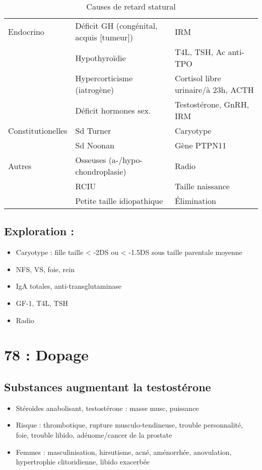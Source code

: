 \documentclass[11pt]{article}
\begin{document}
\begin{table}[htbp]
\caption{\label{tab:org2ea0a1e}
Causes de retard statural}
\centering
\begin{tabular}{lll}
\toprule
Endocrino & Déficit GH (congénital, acquis [tumeur]) & IRM\\
 & Hypothyroïdie & T4L, TSH, Ac anti-TPO\\
 & Hypercorticisme (iatrogène) & Cortisol libre urinaire/à 23h, ACTH\\
 & Déficit hormones sex. & Testostérone, GnRH, IRM\\
\midrule
Constitutionelles & Sd Turner & Caryotype\\
 & Sd Noonan & Gène PTPN11\\
\midrule
Autres & Osseuses (a-/hypo-chondroplasie) & Radio\\
 & RCIU & Taille naissance\\
 & Petite taille idiopathique & Élimination\\
\bottomrule
\end{tabular}
\end{table}


\subsection{Exploration :}
\label{sec:org79af8c2}
\begin{itemize}
\item Caryotype : fille taille < -2DS ou < -1.5DS sous taille parentale moyenne
\item NFS, VS, foie, rein
\item IgA totales, anti-transglutaminase
\item GF-1, T4L, TSH
\item Radio
\end{itemize}

\section{78 : Dopage}
\label{sec:org3f3d340}
\subsection{Substances augmentant la testostérone}
\label{sec:org3c96f5b}
\begin{itemize}
\item Stéroïdes anabolisant, testostérone : \inc masse musc, puissance
\item Risque : thrombotique, rupture musculo-tendineuse, trouble personnalité, foie, trouble libido, adénome/cancer de la prostate
\item Femmes : masculinisation, hirsutisme, acné, aménorrhée, anovulation, hypertrophie clitoridienne, libido exacerbée
\end{itemize}
\end{document}
